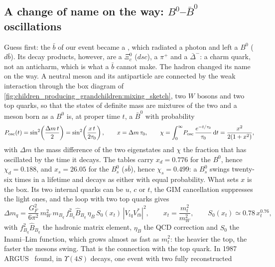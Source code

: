 \subsection{A change of name on the way: \texorpdfstring{$B^0$--$\bar B^0$}{B0-B0bar} oscillations}
\label{sec:children_producing_grandchildren:mixing}

Guess first: the $\bar b$ of our event became a \Bstar, which radiated a
photon and left a $B^0$ ($d\bar b$). Its decay products, however, are a
$\Xi_c^0$ ($dsc$), a $\pi^+$ and a $\bar\Delta^-$: a charm quark, not an
anticharm, which is what a $\bar b$ cannot make. The hadron changed its
name on the way. A neutral meson and its antiparticle are connected by
the weak interaction through the box diagram of
\cref{fig:children_producing_grandchildren:mixing_sketch}, two $W$ bosons
and two top quarks, so that the states of definite mass are mixtures of
the two and a meson born as a $B^0$ is, at proper time $t$, a $\bar B^0$
with probability
\begin{equation}
  P_{\mathrm{osc}}(t)=\sin^2\!\left(\frac{\Delta m\,t}{2}\right)
  =\sin^2\!\left(\frac{x\,t}{2\tau_0}\right),\qquad
  x=\Delta m\,\tau_0,\qquad
  \chi=\int_0^\infty\!P_{\mathrm{osc}}\,\frac{e^{-t/\tau_0}}{\tau_0}\,\mathrm{d}t
  =\frac{x^2}{2(1+x^2)},
  \label{eq:children_producing_grandchildren:mixing}
\end{equation}
with $\Delta m$ the mass difference of the two eigenstates and $\chi$ the
fraction that has oscillated by the time it decays. The tables carry
$x_d=0.776$ for the $B^0$, hence $\chi_d=0.188$, and $x_s=26.05$ for the
$B_s^0$ ($s\bar b$), hence $\chi_s=0.499$: a $B_s^0$ swings twenty-six
times in a lifetime and decays as either with equal probability. What
sets $x$ is the box. Its two internal quarks can be $u$, $c$ or $t$, the
GIM cancellation suppresses the light ones, and the loop with two top
quarks gives~\cite{Inami:1980fz,Buras:1990fn}
\begin{equation}
  \Delta m_q=\frac{G_F^2}{6\pi^2}\,m_W^2\,m_{B_q}\,f_{B_q}^2\hat B_{B_q}\,
  \eta_B\,S_0(x_t)\,|V_{tq}V_{tb}^*|^2,\qquad
  x_t=\frac{m_t^2}{m_W^2},\qquad S_0(x_t)\simeq0.78\,x_t^{0.76},
  \label{eq:children_producing_grandchildren:boxdm}
\end{equation}
with $f_{B_q}^2\hat B_{B_q}$ the hadronic matrix element, $\eta_B$ the
QCD correction and $S_0$ the Inami--Lim function, which grows almost as
fast as $m_t^2$: the heavier the top, the faster the mesons swing. That
is the connection with the top quark. In 1987 ARGUS~\cite{ARGUS:1987xtv}
found, in $\Upsilon(4S)$ decays, one event with two fully reconstructed

